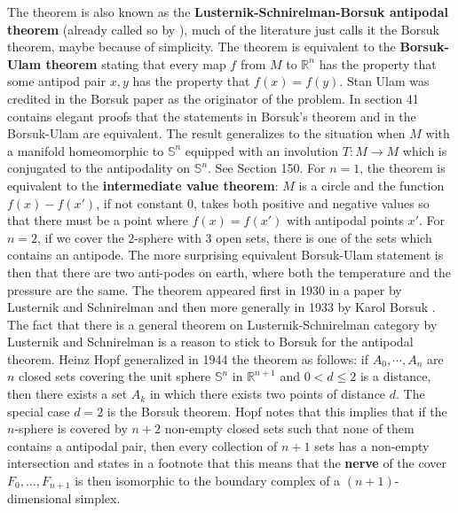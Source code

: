 \documentclass[12pt]{amsart}
\begin{document}
The theorem is also known as the {\bf Lusternik-Schnirelman-Borsuk antipodal theorem} 
(already called so by \cite{Hopf1944}),
much of the literature just calls it the Borsuk theorem, maybe because of simplicity.
The theorem is equivalent to the {\bf Borsuk-Ulam theorem} stating 
that every map $f$ from $M$ to $\mathbb{R}^n$ 
has the property that some antipod pair $x,y$ has the property that $f(x)=f(y)$. 
Stan Ulam was credited in the Borsuk paper as the originator of the problem.
In \cite{Bollobas2006} section 41 contains elegant proofs that
the statements in Borsuk's theorem and in the Borsuk-Ulam are equivalent.
The result generalizes to the situation when $M$ with a manifold homeomorphic 
to $\mathbb{S}^n$ equipped with an involution $T: M \to M$ which is conjugated to the 
antipodality on $\mathbb{S}^n$.
See \cite{Bollobas2006} Section 150.
For $n=1$, the theorem is equivalent to the {\bf intermediate value theorem}: $M$ is a circle
and the function $f(x)-f(x')$, if not constant $0$, takes both positive and negative values
so that there must be a point where $f(x)=f(x')$ with antipodal points $x'$. 
For $n=2$, if we cover the $2$-sphere with $3$ open sets, there is one of the sets
which contains an antipode. The more surprising equivalent Borsuk-Ulam statement is then
that there are two anti-podes on earth, where both the temperature and the pressure 
are the same. The theorem appeared first in 1930 in a paper by Lusternik and Schnirelman and
then more generally in 1933 by Karol Borsuk \cite{Borsuk1933}. 
The fact that there is a general theorem on Lusternik-Schnirelman 
category by Lusternik and Schnirelman is a reason to stick to Borsuk for the antipodal theorem. 
Heinz Hopf generalized in 1944 the theorem as follows: if $A_0, \cdots, A_n$ are
$n$ closed sets covering the unit sphere $\mathbb{S}^n$ in $\mathbb{R}^{n+1}$
and $0<d \leq 2$ is a distance, then there exists a set $A_k$ in which 
there exists two points of distance $d$. The special case $d=2$ is the Borsuk theorem.  
Hopf notes that this implies that if the $n$-sphere is covered by $n+2$ non-empty closed
sets such that none of them contains a antipodal pair, then every collection of $n+1$
sets has a non-empty intersection and states in a footnote that this means that the
{\bf nerve} of the cover $F_0, \dots, F_{n+1}$ is then isomorphic to the boundary complex
of a $(n+1)$-dimensional simplex. 
\end{document}
